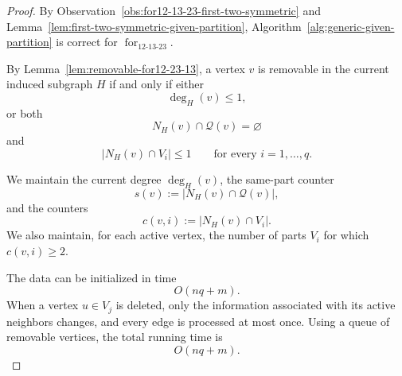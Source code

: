 \documentclass[12pt]{article}
\theoremstyle{plain}
\theoremstyle{definition}
\theoremstyle{remark}
\theoremstyle{definition}
\newcommand{\forlabel}{\mathrm{for}}
\DeclareRobustCommand{\forparam}[1]{%
  \ensuremath{\mathop{\forlabel}\nolimits_{#1}}%
}
\begin{document}
\begin{proof}
By Observation~\ref{obs:for12-13-23-first-two-symmetric} and
Lemma~\ref{lem:first-two-symmetric-given-partition},
Algorithm~\ref{alg:generic-given-partition} is correct for
\(\forparam{12\text{-}13\text{-}23}\).

By Lemma~\ref{lem:removable-for12-23-13}, a vertex \(v\) is removable in
the current induced subgraph \(H\) if and only if either
\[
\deg_H(v)\le1,
\]
or both
\[
N_H(v)\cap\mathcal Q(v)=\varnothing
\]
and
\[
|N_H(v)\cap V_i|\le1
\qquad
\text{for every }i=1,\dots,q.
\]

We maintain the current degree \(\deg_H(v)\), the same-part counter
\[
s(v):=|N_H(v)\cap\mathcal Q(v)|,
\]
and the counters
\[
c(v,i):=|N_H(v)\cap V_i|.
\]
We also maintain, for each active vertex, the number of parts \(V_i\) for
which \(c(v,i)\ge2\).

The data can be initialized in time
\[
O(nq+m).
\]
When a vertex \(u\in V_j\) is deleted, only the information associated
with its active neighbors changes, and every edge is processed at most
once. Using a queue of removable vertices, the total running time is
\[
O(nq+m).
\]
\end{proof}








\printbibliography
\end{document}
